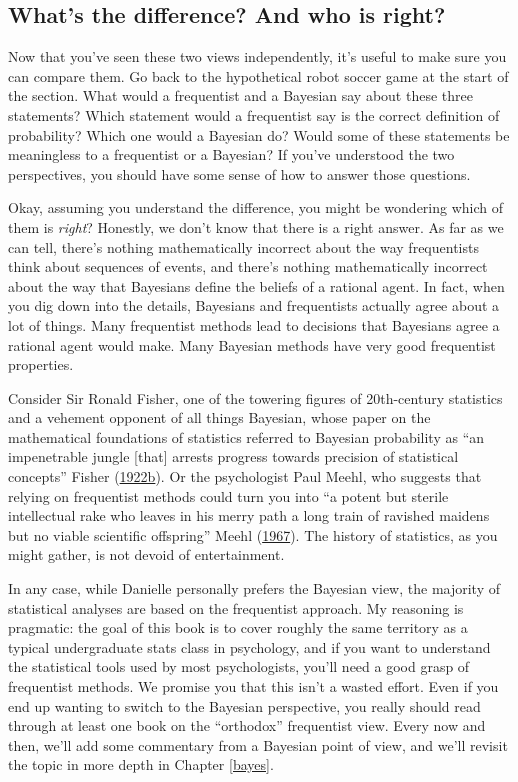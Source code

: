\documentclass[
]{book}
\theoremstyle{definition}
\theoremstyle{definition}
\theoremstyle{definition}
\theoremstyle{definition}
\theoremstyle{remark}
\begin{document}
\hypertarget{whats-the-difference-and-who-is-right}{%
\subsection{What's the difference? And who is right?}\label{whats-the-difference-and-who-is-right}}

Now that you've seen these two views independently, it's useful to make sure you can compare them. Go back to the hypothetical robot soccer game at the start of the section. What would a frequentist and a Bayesian say about these three statements? Which statement would a frequentist say is the correct definition of probability? Which one would a Bayesian do? Would some of these statements be meaningless to a frequentist or a Bayesian? If you've understood the two perspectives, you should have some sense of how to answer those questions.

Okay, assuming you understand the difference, you might be wondering which of them is \emph{right}? Honestly, we don't know that there is a right answer. As far as we can tell, there's nothing mathematically incorrect about the way frequentists think about sequences of events, and there's nothing mathematically incorrect about the way that Bayesians define the beliefs of a rational agent. In fact, when you dig down into the details, Bayesians and frequentists actually agree about a lot of things. Many frequentist methods lead to decisions that Bayesians agree a rational agent would make. Many Bayesian methods have very good frequentist properties.

Consider Sir Ronald Fisher, one of the towering figures of 20th-century statistics and a vehement opponent of all things Bayesian, whose paper on the mathematical foundations of statistics referred to Bayesian probability as ``an impenetrable jungle {[}that{]} arrests progress towards precision of statistical concepts'' Fisher (\protect\hyperlink{ref-Fisher1922b}{1922b}). Or the psychologist Paul Meehl, who suggests that relying on frequentist methods could turn you into ``a potent but sterile intellectual rake who leaves in his merry path a long train of ravished maidens but no viable scientific offspring'' Meehl (\protect\hyperlink{ref-Meehl1967}{1967}). The history of statistics, as you might gather, is not devoid of entertainment.

In any case, while Danielle personally prefers the Bayesian view, the majority of statistical analyses are based on the frequentist approach. My reasoning is pragmatic: the goal of this book is to cover roughly the same territory as a typical undergraduate stats class in psychology, and if you want to understand the statistical tools used by most psychologists, you'll need a good grasp of frequentist methods. We promise you that this isn't a wasted effort. Even if you end up wanting to switch to the Bayesian perspective, you really should read through at least one book on the ``orthodox'' frequentist view. Every now and then, we'll add some commentary from a Bayesian point of view, and we'll revisit the topic in more depth in Chapter \ref{bayes}.
\end{document}
